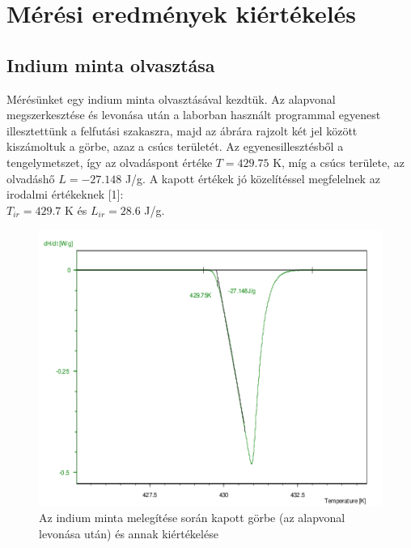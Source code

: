 \documentclass[12pt,a4paper]{article}
\begin{document}
\section{Mérési eredmények kiértékelés}
\subsection{Indium minta olvasztása}
\hspace*{10pt} Mérésünket egy indium minta olvasztásával kezdtük. Az alapvonal megszerkesztése és levonása után a laborban használt programmal egyenest illesztettünk a felfutási szakaszra, majd az ábrára rajzolt két jel között kiszámoltuk a görbe, azaz a csúcs területét. Az egyenesillesztésből a tengelymetszet, így az olvadáspont értéke $T=429.75$ K, míg a csúcs területe, az olvadáshő  $L=-27.148$ J/g. A kapott értékek jó közelítéssel megfelelnek az irodalmi értékeknek [1]:\\ $T_{ir}=429.7$ K és $L_{ir}=28.6$ J/g.\\
\begin{figure}[!h]
\centering
  \includegraphics[width=0.8\linewidth]{2fin}
\caption{Az indium minta melegítése során kapott görbe (az alapvonal levonása után) és annak kiértékelése}
\end{figure}
\newpage
\end{document}

